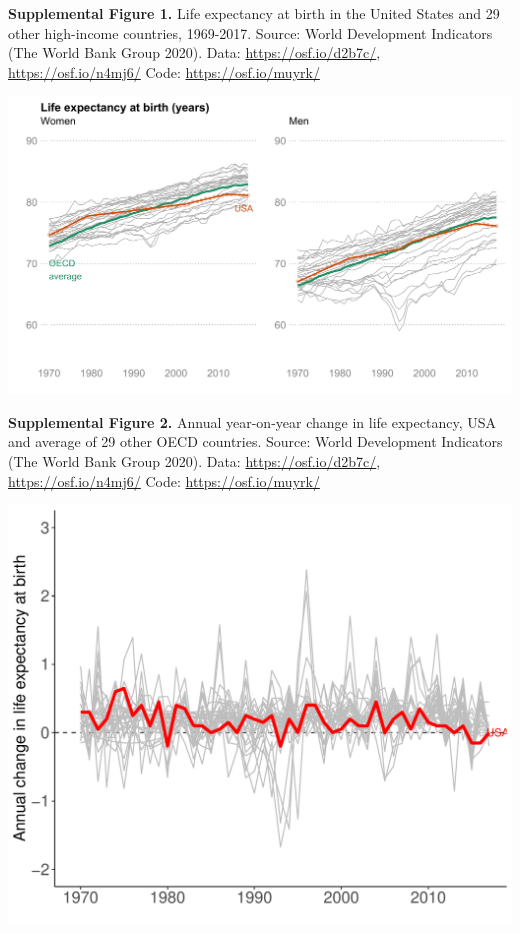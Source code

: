 \documentclass[
  11pt,
]{article}
\begin{document}
\newpage

\textbf{Supplemental Figure 1.} Life expectancy at birth in the United
States and 29 other high-income countries, 1969-2017. Source: World
Development Indicators (The World Bank Group 2020). Data:
\url{https://osf.io/d2b7c/}, \url{https://osf.io/n4mj6/} Code:
\url{https://osf.io/muyrk/}

\includegraphics[width=1\linewidth]{../figures/us-le-trends-gender}

\newpage

\textbf{Supplemental Figure 2.} Annual year-on-year change in life
expectancy, USA and average of 29 other OECD countries. Source: World
Development Indicators (The World Bank Group 2020). Data:
\url{https://osf.io/d2b7c/}, \url{https://osf.io/n4mj6/} Code:
\url{https://osf.io/muyrk/}

\includegraphics[width=1\linewidth]{../figures/us-le-change}
\end{document}
